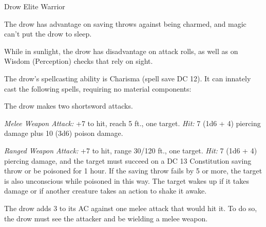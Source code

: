 \documentclass[10pt,a4paper,twoside,bg=none,twocolumn,openany,nodeprecatedcode]{dndbook}
\begin{document}
\begin{DndMonster}[float=t]{Drow Elite Warrior}
\DndMonsterBasics[
armor-class = {18 (studded leather armor)},
hit-points = {\DndDice{11d8 + 22}},
speed = {30 ft.}
]
\DndMonsterAbilityScores[
 str = 13,
 dex = 18,
 con = 14,
 int = 11,
 wis = 13,
 cha = 12
]
\DndMonsterDetails[
saving-throws = {Dex +7, Con +5, Wis +4},
skills = {Perception +4, Stealth +10},
senses = {darkvision 120 ft., passive perception 14},
languages = {Elvish, Undercommon},
challenge = 5,
]
The drow has advantage on saving throws against being charmed, and magic can't put the drow to sleep.

While in sunlight, the drow has disadvantage on attack rolls, as well as on Wisdom (Perception) checks that rely on sight.

The drow's spellcasting ability is Charisma (spell save DC 12). It can innately cast the following spells, requiring no material components:
\begin{DndMonsterSpells}
\end{DndMonsterSpells}
\par
{}
The drow makes two shortsword attacks.

\textsl{Melee Weapon Attack:} +7 to hit, reach 5 ft., one target. \textsl{Hit:} 7 (1d6 + 4) piercing damage plus 10 (3d6) poison damage.

\textsl{Ranged Weapon Attack:} +7 to hit, range 30/120 ft., one target. \textsl{Hit:} 7 (1d6 + 4) piercing damage, and the target must succeed on a DC 13 Constitution saving throw or be poisoned for 1 hour. If the saving throw fails by 5 or more, the target is also unconscious while poisoned in this way. The target wakes up if it takes damage or if another creature takes an action to shake it awake.

\par
{}
The drow adds 3 to its AC against one melee attack that would hit it. To do so, the drow must see the attacker and be wielding a melee weapon.

\end{DndMonster}
\end{document}
